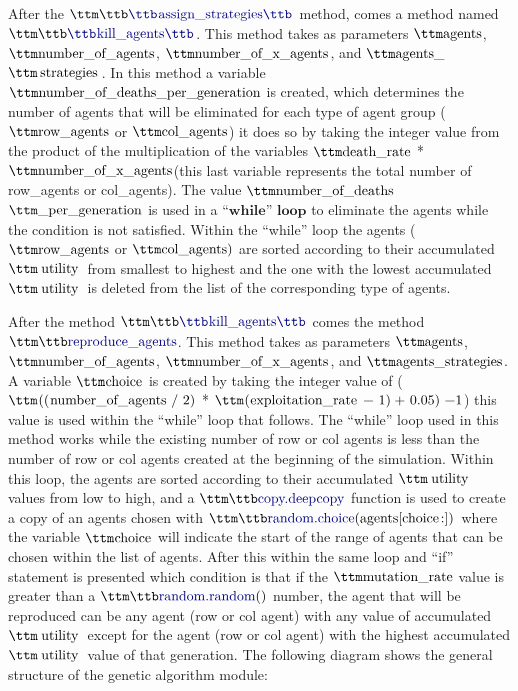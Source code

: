 After the $\pythoninline{assign\_strategies}$ method, comes a method named $\pythoninline{kill\_agents}$. This method takes as parameters $\pythoninline{agents}$, $\pythoninline{number\_of\_agents}$, $\pythoninline{number\_of\_x\_agents}$, and                       $\pythoninline{agents\_}$ $\pythoninline{strategies}$. In this method a variable $\pythoninline{number\_of\_deaths\_per\_generation}$ is created, which determines the number of agents that will be eliminated for each type of agent group ($\pythoninline{row\_agents}$ or $\pythoninline{ col\_agents}$) it does so by taking the integer value from the product of the multiplication of the variables $\pythoninline{death\_rate}$ * $\pythoninline{number\_of\_x\_agents}$(this last variable represents the total number of row\_agents or col\_agents).  The value $\pythoninline{number\_of\_deaths}$ $\pythoninline{\_per\_generation}$ is used in a $\textbf{``while'' loop}$ to eliminate the agents while the condition is not satisfied. Within the ``while'' loop the agents ($\pythoninline{row\_agents}$ or $\pythoninline{col\_agents)}$  are sorted according to their accumulated $\pythoninline{utility}$ from smallest to highest and the one with the lowest accumulated $\pythoninline{utility}$ is deleted from the list of the corresponding type of agents.

After the method $\pythoninline{kill\_agents}$ comes the method $\pythoninline{reproduce\_agents}$. This method takes as parameters $\pythoninline{agents}$, $\pythoninline{number\_of\_agents}$, $\pythoninline{number\_of\_x\_agents}$, and $\pythoninline{agents\_strategies}$. A variable $\pythoninline{choice}$ is created by taking the integer value of ($\pythoninline{((number\_of\_agents / 2) }$ * $\pythoninline{(exploitation\_rate - 1) + 0.05) -1}$) this value is used within the ``while'' loop that follows. The ``while'' loop used in this method works while the existing number of row or col agents is less than the number of row or col agents created at the beginning of the simulation. Within this loop, the agents are sorted according to their accumulated $\pythoninline{utility}$ values from low to high, and a $\pythoninline{copy.deepcopy}$  function is used to create a copy of an agents chosen with $\pythoninline{random.choice(agents[choice:])}$ where the variable $\pythoninline{choice}$ will indicate the start of the range of agents that can be chosen within the list of agents. After this within the same loop and ``if'' statement is presented which condition is that if the $\pythoninline{mutation\_rate}$ value is greater than a $\pythoninline{random.random()}$ number, the agent that will be reproduced can be any agent (row or col agent) with any value of accumulated $\pythoninline{utility}$ except for the agent (row or col agent) with the highest accumulated $\pythoninline{utility}$  value of that generation. The following diagram shows the general structure of the genetic algorithm module:

